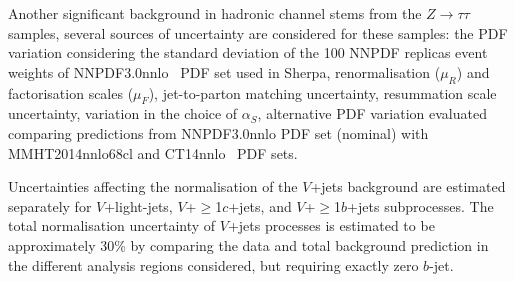 Another significant background in hadronic channel stems from the $Z\rightarrow \tau\tau$ samples, several sources of uncertainty are
considered for these samples: the PDF variation considering the standard deviation of the 100 NNPDF replicas event weights
of NNPDF3.0nnlo~\cite{Ball:2015NNPDF} PDF
set used in Sherpa, renormalisation ($\mu_{R}$) and factorisation scales ($\mu_{F}$), jet-to-parton matching uncertainty, resummation scale uncertainty,
variation in the choice of $\alpha_{S}$, alternative PDF variation evaluated comparing predictions from NNPDF3.0nnlo PDF set (nominal)
with MMHT2014nnlo68cl and CT14nnlo~\cite{Lai:2010vv,Gao:2013xoa} PDF sets.

Uncertainties affecting the normalisation of the $V$+jets background are estimated separately for $V$+light-jets, $V$+$\geq$1$c$+jets,
and $V$+$\geq$1$b$+jets subprocesses. The total normalisation uncertainty of $V$+jets processes is estimated to be approximately 30\% by comparing the
data and total background prediction in the different analysis regions considered, but requiring exactly zero $b$-jet.




